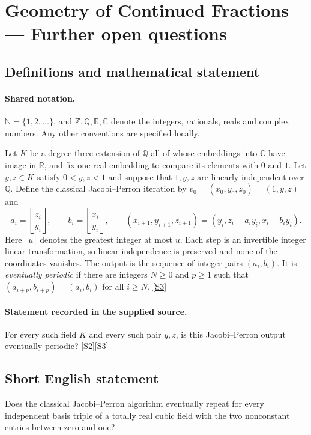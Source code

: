 \documentclass[11pt]{book}
\newcommand{\sref}[2]{\hyperlink{source:#1:#2}{[S#2]}}
\begin{document}
\section{Geometry of Continued Fractions — Further open questions}\label{statement}

\subsection{Definitions and mathematical statement}

\paragraph{Shared notation.}$\mathbb N=\{1,2,\ldots\}$, and $\mathbb Z,\mathbb Q,\mathbb R,\mathbb C$ denote the integers, rationals, reals and complex numbers. Any other conventions are specified locally.


Let $K$ be a degree-three extension of $\mathbb Q$ all of whose embeddings into $\mathbb C$ have image in $\mathbb R$, and fix one real embedding to compare its elements with $0$ and $1$. Let $y,z\in K$ satisfy $0<y,z<1$ and suppose that $1,y,z$ are linearly independent over $\mathbb Q$. Define the classical Jacobi--Perron iteration by $v_0=(x_0,y_0,z_0)=(1,y,z)$ and
\[
 a_i=\left\lfloor\frac{z_i}{y_i}\right\rfloor,\qquad
 b_i=\left\lfloor\frac{x_i}{y_i}\right\rfloor,\qquad
 (x_{i+1},y_{i+1},z_{i+1})=(y_i,z_i-a_i y_i,x_i-b_i y_i).
\]
Here $\lfloor u\rfloor$ denotes the greatest integer at most $u$. Each step is an invertible integer linear transformation, so linear independence is preserved and none of the coordinates vanishes. The output is the sequence of integer pairs $(a_i,b_i)$. It is \emph{eventually periodic} if there are integers $N\ge0$ and $p\ge1$ such that $(a_{i+p},b_{i+p})=(a_i,b_i)$ for all $i\ge N$. \sref{statement}{3}
\paragraph{Statement recorded in the supplied source.}
For every such field $K$ and every such pair $y,z$, is this Jacobi--Perron output eventually periodic? \sref{statement}{2}\sref{statement}{3}
\subsection{Short English statement}
Does the classical Jacobi--Perron algorithm eventually repeat for every independent basis triple of a totally real cubic field with the two nonconstant entries between zero and one?
\end{document}
